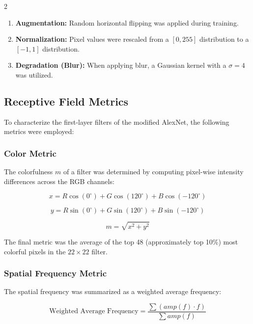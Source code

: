 \begin{multicols}{2}
\begin{enumerate}
\item \textbf{Augmentation:} Random horizontal flipping was applied during training.

\item \textbf{Normalization:} Pixel values were rescaled from a $[0, 255]$ distribution to a $[-1, 1]$ distribution.

\item \textbf{Degradation (Blur):} When applying blur, a Gaussian kernel with a $\sigma = 4$ was utilized.

\end{enumerate}

\subsection{Receptive Field Metrics}
\label{app:metrics_rf}

To characterize the first-layer filters of the modified AlexNet, the following metrics were employed:

\subsubsection{Color Metric}
\label{app:metrics_color}

The colorfulness $m$ of a filter was determined by computing pixel-wise intensity differences across the RGB channels:

\begin{equation}
x = R \cos(0^\circ) + G \cos(120^\circ) + B \cos(-120^\circ)
\end{equation}

\begin{equation}
y = R \sin(0^\circ) + G \sin(120^\circ) + B \sin(-120^\circ)
\end{equation}

\begin{equation}
m = \sqrt{x^2 + y^2}
\end{equation}

The final metric was the average of the top 48 (approximately top 10\%) most colorful pixels in the $22 \times 22$ filter.

\subsubsection{Spatial Frequency Metric}

The spatial frequency was summarized as a weighted average frequency:

\begin{equation}
\text{Weighted Average Frequency} = \frac{\sum (amp(f) \cdot f)}{\sum amp(f)}
\end{equation}


\end{multicols}
